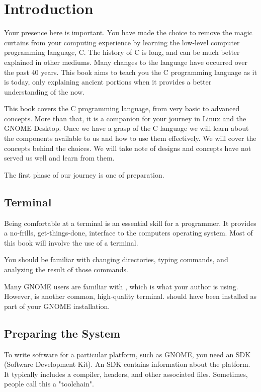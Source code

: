\chapter{Introduction}

Your presence here is important. You have made the choice to remove the magic
curtains from your computing experience by learning the low-level computer
programming language, C. The history of C is long, and can be much better
explained in other mediums. Many changes to the language have occurred over
the past 40 years. This book aims to teach you the C programming language as
it is today, only explaining ancient portions when it provides a better
understanding of the now.

This book covers the C programming language, from very basic to advanced
concepts. More than that, it is a companion for your journey in Linux and the
GNOME Desktop. Once we have a grasp of the C language we will learn about the
components available to us and how to use them effectively. We will cover the
concepts behind the choices. We will take note of designs and concepts have
not served us well and learn from them.

The first phase of our journey is one of preparation.


\section{Terminal}

Being comfortable at a terminal is an essential skill for a programmer. It
provides a no-frills, get-things-done, interface to the computers operating
system. Most of this book will involve the use of a terminal.

You should be familiar with changing directories, typing commands, and
analyzing the result of those commands.

Many GNOME users are familiar with , which is what your
author is using. However,  is another common, high-quality
terminal.  should have been installed as part of your
GNOME installation.


\section{Preparing the System}

To write software for a particular platform, such as GNOME, you need an SDK
(Software Development Kit). An SDK contains information about the platform. It
typically includes a compiler, headers, and other associated files. Sometimes,
people call this a "toolchain".

